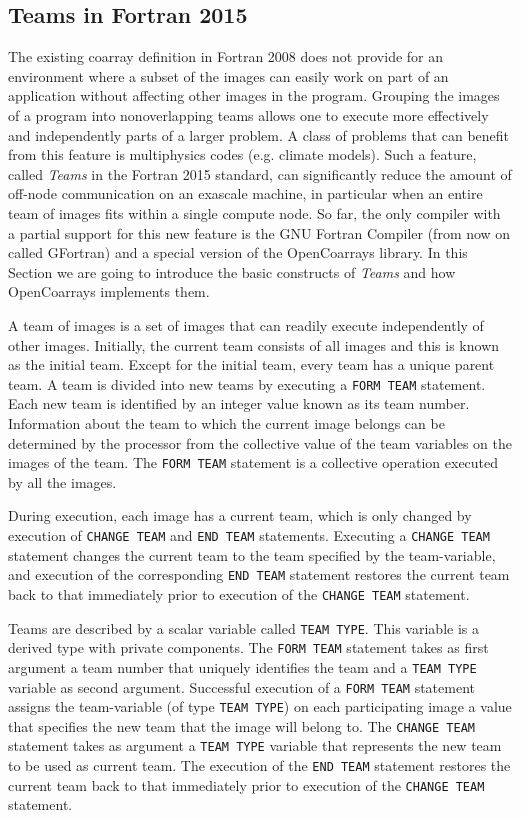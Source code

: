 \subsection{Teams in Fortran 2015}\label{teams-in-fortran-2015}
The existing coarray definition in Fortran 2008 does not provide for an environment
where a subset of the images can easily work on part of an application without affecting
other images in the program.  Grouping the images of a program into nonoverlapping
teams allows one to execute more effectively and independently parts of a larger
problem.  A class of problems that can benefit from this feature is multiphysics codes
(e.g.  climate models).
Such a feature, called \textit{Teams} in the Fortran 2015 standard, can significantly reduce the amount of off-node
communication on an exascale machine, in particular when an entire team of images
fits within a single compute node.
So far, the only compiler with a partial support for this new feature is the GNU Fortran Compiler (from now on
called GFortran) and a special version of the OpenCoarrays library.
In this Section we are going to introduce the basic constructs of \textit{Teams} and how OpenCoarrays implements them.

A team of images is a set of images that can readily execute independently of other images.
Initially, the current team consists of all images and this is
known as the initial team. Except for the initial team, every team has a unique parent team. A team is divided
into new teams by executing a \texttt{FORM TEAM} statement.
Each new team is identified by an integer value known
as its team number. Information about the team to which the current image belongs can be determined by the
processor from the collective value of the team variables on the images of the team.
The \texttt{FORM TEAM} statement is a collective operation executed by all the images.

During execution, each image has a current team, which is only changed by execution of \texttt{CHANGE TEAM} and
\texttt{END TEAM} statements. Executing a \texttt{CHANGE TEAM} statement changes the current team to the team specified
by the team-variable, and execution of the corresponding \texttt{END TEAM} statement restores the current team back
to that immediately prior to execution of the \texttt{CHANGE TEAM} statement.

Teams are described by a scalar variable called \texttt{TEAM TYPE}. This variable is a derived type with private components.
The \texttt{FORM TEAM} statement takes as first argument a team number that uniquely identifies the team and a \texttt{TEAM TYPE}
variable as second argument.
Successful execution of a \texttt{FORM TEAM} statement assigns the team-variable (of type \texttt{TEAM TYPE}) on each
participating image a value that specifies the new team that the image will belong to.
The \texttt{CHANGE TEAM} statement takes as argument a \texttt{TEAM TYPE} variable that represents the new team to be used as
current team. The execution of the \texttt{END TEAM} statement restores the current team back
to that immediately prior to execution of the \texttt{CHANGE TEAM} statement.

